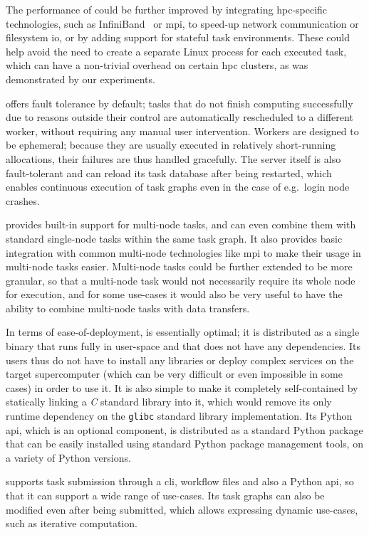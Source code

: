 \begin{description}[wide=0pt]
		The performance of \hyperqueue{} could be further improved by integrating
		\gls{hpc}-specific technologies, such as InfiniBand~\cite{infiniband} or
		\gls{mpi}, to speed-up network communication or filesystem
		\gls{io}, or by adding support for stateful task environments. These could help
		avoid the need to create a separate Linux process for each executed task, which can have a
		non-trivial overhead on certain \gls{hpc} clusters, as was demonstrated by our
		experiments.
	\item[Fault tolerance] \hyperqueue{} offers fault tolerance by default; tasks that do not
		finish computing successfully due to reasons outside their control are automatically rescheduled to
		a different worker, without requiring any manual user intervention. Workers are designed to be
		ephemeral; because they are usually executed in relatively short-running allocations, their
		failures are thus handled gracefully. The server itself is also fault-tolerant and can reload its
		task database after being restarted, which enables continuous execution of task graphs even in the
		case of e.g.\ login node crashes.
	\item[Multi-node tasks] \hyperqueue{} provides built-in support for multi-node tasks, and
		can even combine them with standard single-node tasks within the same task graph. It also provides
		basic integration with common multi-node technologies like \gls{mpi} to make their
		usage in multi-node tasks easier. Multi-node tasks could be further extended to be more granular,
		so that a multi-node task would not necessarily require its whole node for execution, and for some
		use-cases it would also be very useful to have the ability to combine multi-node tasks with data
		transfers.
	\item[Deployment] In terms of ease-of-deployment, \hyperqueue{} is essentially optimal; it is
		distributed as a single binary that runs fully in user-space and that does not have any
		dependencies. Its users thus do not have to install any libraries or deploy complex services on the
		target supercomputer (which can be very difficult or even impossible in some cases) in order to use
		it. It is also simple to make it completely self-contained by statically linking a
		\emph{C} standard library into it, which would remove its only runtime dependency
		on the \texttt{glibc} standard library implementation. Its Python
		\gls{api}, which is an optional component, is distributed as a standard Python
		package that can be easily installed using standard Python package management tools, on a variety
		of Python versions.
	\item[Programming model] \hyperqueue{} supports task submission through a \gls{cli},
		workflow files and also a Python \gls{api}, so that it can support a wide range of
		use-cases. Its task graphs can also be modified even after being submitted, which allows expressing
		dynamic use-cases, such as iterative computation.


\end{description}
